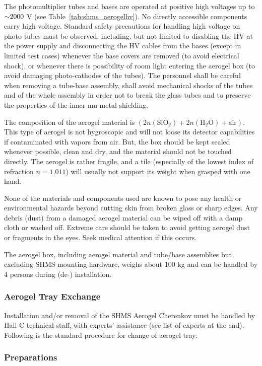 {The photomultiplier tubes and bases are operated at positive high
voltages up to $\mathord{\sim} 2000$ V (see Table~\ref{tab:shms_aerogelhv}). No directly accessible
components carry high voltage. Standard safety precautions for
handling high voltage on photo tubes must be observed, including, but
not limited to disabling the HV at the power supply and disconnecting
the HV cables from the bases (except in limited test cases) whenever
the base covers are removed (to avoid electrical shock), or whenever
there is possibility of room light entering the aerogel box (to avoid
damaging photo-cathodes of the tubes). The personnel shall be careful
when removing a tube-base assembly, shall avoid mechanical shocks of
the tubes and of the whole assembly in order not to break the glass
tubes and to preserve the properties of the inner mu-metal shielding.

The composition of the aerogel material is
$(2n(\textrm{SiO}_2)+2n(\textrm{H}_2 \textrm{O})+\textrm{air})$. This type of aerogel is not hygroscopic and
will not loose its detector capabilities if contaminated with vapors
from air. But, the box should be kept sealed whenever possible, clean
and dry, and the material should not be touched directly. The aerogel
is rather fragile, and a tile (especially of the lowest index of
refraction $n=1.011$) will usually not support its weight when grasped
with one hand.

None of the materials and components used are known to pose any health
or environmental hazards beyond cutting skin from broken glass or
sharp edges. Any debris (dust) from a damaged aerogel material can be
wiped off with a damp cloth or washed off. Extreme care should be
taken to avoid getting aerogel dust or fragments in the eyes. Seek
medical attention if this occurs.

The aerogel box, including aerogel material and tube/base assemblies
but excluding SHMS mounting hardware, weighs about 100 kg and can be
handled by 4 persons during (de-) installation.

\subsubsection{Aerogel Tray Exchange}
Installation and/or removal of the SHMS Aerogel Cherenkov must be
handled by Hall C technical staff, with experts’ assistance (see
list of experts at the end). Following is the standard procedure for
change of aerogel tray:

\subsubsection*{Preparations}

}
